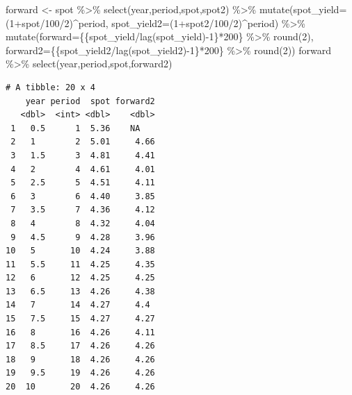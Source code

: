 \documentclass[
  letterpaper,
  DIV=11,
  numbers=noendperiod]{scrreprt}
\newenvironment{Shaded}{\begin{snugshade}}{\end{snugshade}}
\newcommand{\AttributeTok}[1]{\textcolor[rgb]{0.40,0.45,0.13}{#1}}
\newcommand{\DecValTok}[1]{\textcolor[rgb]{0.68,0.00,0.00}{#1}}
\newcommand{\FunctionTok}[1]{\textcolor[rgb]{0.28,0.35,0.67}{#1}}
\newcommand{\NormalTok}[1]{\textcolor[rgb]{0.00,0.23,0.31}{#1}}
\newcommand{\OtherTok}[1]{\textcolor[rgb]{0.00,0.23,0.31}{#1}}
\newcommand{\SpecialCharTok}[1]{\textcolor[rgb]{0.37,0.37,0.37}{#1}}
\begin{document}
\begin{Shaded}
\begin{Highlighting}[]
\NormalTok{forward }\OtherTok{\textless{}{-}}\NormalTok{ spot }\SpecialCharTok{\%\textgreater{}\%} 
  \FunctionTok{select}\NormalTok{(year,period,spot,spot2) }\SpecialCharTok{\%\textgreater{}\%}  
  \FunctionTok{mutate}\NormalTok{(}\AttributeTok{spot\_yield=}\NormalTok{(}\DecValTok{1}\SpecialCharTok{+}\NormalTok{spot}\SpecialCharTok{/}\DecValTok{100}\SpecialCharTok{/}\DecValTok{2}\NormalTok{)}\SpecialCharTok{\^{}}\NormalTok{period,}
         \AttributeTok{spot\_yield2=}\NormalTok{(}\DecValTok{1}\SpecialCharTok{+}\NormalTok{spot2}\SpecialCharTok{/}\DecValTok{100}\SpecialCharTok{/}\DecValTok{2}\NormalTok{)}\SpecialCharTok{\^{}}\NormalTok{period) }\SpecialCharTok{\%\textgreater{}\%} 
  \FunctionTok{mutate}\NormalTok{(}\AttributeTok{forward=}\NormalTok{\{\{spot\_yield}\SpecialCharTok{/}\FunctionTok{lag}\NormalTok{(spot\_yield)}\SpecialCharTok{{-}}\DecValTok{1}\NormalTok{\}}\SpecialCharTok{*}\DecValTok{200}\NormalTok{\} }\SpecialCharTok{\%\textgreater{}\%} \FunctionTok{round}\NormalTok{(}\DecValTok{2}\NormalTok{),}
         \AttributeTok{forward2=}\NormalTok{\{\{spot\_yield2}\SpecialCharTok{/}\FunctionTok{lag}\NormalTok{(spot\_yield2)}\SpecialCharTok{{-}}\DecValTok{1}\NormalTok{\}}\SpecialCharTok{*}\DecValTok{200}\NormalTok{\} }\SpecialCharTok{\%\textgreater{}\%} \FunctionTok{round}\NormalTok{(}\DecValTok{2}\NormalTok{))}
\NormalTok{forward }\SpecialCharTok{\%\textgreater{}\%} \FunctionTok{select}\NormalTok{(year,period,spot,forward2)}
\end{Highlighting}
\end{Shaded}

\begin{verbatim}
# A tibble: 20 x 4
    year period  spot forward2
   <dbl>  <int> <dbl>    <dbl>
 1   0.5      1  5.36    NA   
 2   1        2  5.01     4.66
 3   1.5      3  4.81     4.41
 4   2        4  4.61     4.01
 5   2.5      5  4.51     4.11
 6   3        6  4.40     3.85
 7   3.5      7  4.36     4.12
 8   4        8  4.32     4.04
 9   4.5      9  4.28     3.96
10   5       10  4.24     3.88
11   5.5     11  4.25     4.35
12   6       12  4.25     4.25
13   6.5     13  4.26     4.38
14   7       14  4.27     4.4 
15   7.5     15  4.27     4.27
16   8       16  4.26     4.11
17   8.5     17  4.26     4.26
18   9       18  4.26     4.26
19   9.5     19  4.26     4.26
20  10       20  4.26     4.26
\end{verbatim}
\end{document}
